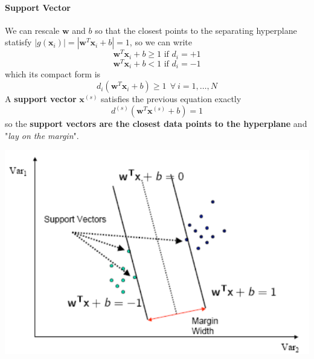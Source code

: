 \documentclass[10pt]{report}
\begin{document}
\paragraph{Support Vector} We can rescale $\mathbf{w}$ and $b$ so that the closest points to the separating hyperplane statisfy $|g(\mathbf{x}_i)| = |\mathbf{w}^T\mathbf{x}_i + b| = 1$, so we can write $$\mathbf{w}^T\mathbf{x}_i + b \geq 1\text{ if }d_i = +1$$ $$\mathbf{w}^T\mathbf{x}_i + b < 1\text{ if }d_i = -1$$ which its compact form is $$d_i(\mathbf{w}^T\mathbf{x}_i + b) \geq 1\:\:\forall\:i=1,\ldots,N$$
A \textbf{support vector} $\mathbf{x}^{(s)}$ satisfies the previous equation exactly $$d^{(s)}(\mathbf{w}^T\mathbf{x}^{(s)}+b) = 1$$ so the \textbf{support vectors are the closest data points to the hyperplane} and "\textit{lay on the margin}".
\begin{center}
	\includegraphics[scale=0.5]{19.png}
\end{center}
\end{document}

